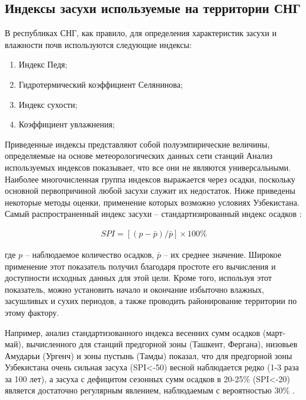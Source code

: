 \subsection{Индексы засухи используемые на территории СНГ}

В республиках СНГ, как правило, для определения характеристик засухи и влажности почв используются следующие индексы:

\begin{enumerate}
	\item Индекс Педя;
	\item Гидротермический коэффициент Селянинова;
	\item Индекс сухости; 
	\item Коэффициент увлажнения;
\end{enumerate}

Приведенные индексы представляют собой полуэмпирические величины, определяемые на основе метеорологических данных сети станций
Анализ используемых индексов показывает, что все они не являются универсальными. Наиболее многочисленная группа индексов выражается через осадки, поскольку основной первопричиной любой засухи служит их недостаток. 
Ниже приведены некоторые методы оценки, применение которых возможно условиях Узбекистана.
Самый распространенный индекс засухи – стандартизированный индекс осадков \cite{Handbook2016, WMO1090}:

\begin{equation}\label{eq_1.1}
\begin{aligned}
	SPI = [(p-\bar{p})/\bar{p}] \times 100\%
\end{aligned}
\end{equation}

где $p$ – наблюдаемое количество осадков, $\bar{p}$ – их среднее значение. 
Широкое применение этот показатель получил благодаря простоте его вычисления и доступности исходных данных для этой цели. Кроме того, используя этот показатель, можно установить начало и окончание избыточно влажных, засушливых и сухих периодов, а также проводить районирование территории по этому фактору.

Например, анализ стандартизованного индекса весенних сумм осадков (март- май), вычисленного для станций предгорной зоны (Ташкент, Фергана), низовьев Амударьи (Ургенч) и зоны пустынь (Тамды) показал, что для предгорной зоны Узбекистана очень сильная засуха (SPI<-50) весной наблюдается редко (1-3 раза за 100 лет), а засуха с дефицитом сезонных сумм осадков в 20-25\% (SPI<-20) является достаточно регулярным явлением, наблюдаемым с вероятностью 30\% \cite{Myagkov2004}.

